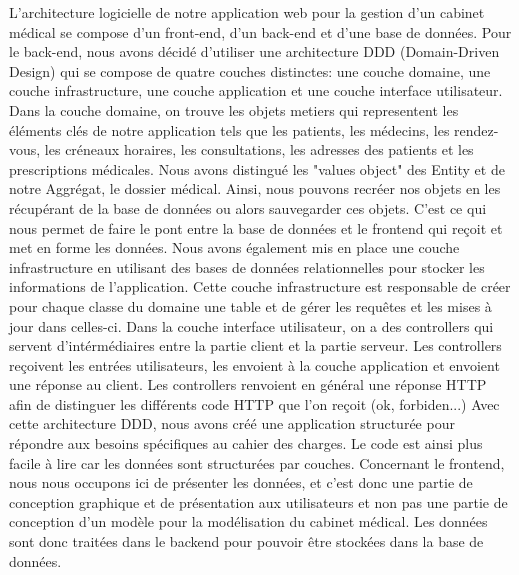 \documentclass[a4paper]{report}
\begin{document}
L'architecture logicielle de notre application web pour la gestion d'un cabinet médical se compose d'un front-end, d'un back-end et d'une base de données.
Pour le back-end, nous avons décidé d'utiliser une architecture DDD (Domain-Driven Design) qui se compose de quatre couches distinctes: une couche domaine, 
une couche infrastructure, une couche application et une couche interface utilisateur. \newline \newline
Dans la couche domaine, on trouve les objets metiers qui representent les éléments clés de notre application tels que les patients, les médecins, les rendez-vous, les créneaux horaires, les consultations, 
les adresses des patients et les prescriptions médicales. 
Nous avons distingué les "values object" des Entity et de notre Aggrégat, le dossier médical. Ainsi, nous pouvons recréer nos objets en les récupérant de la base de données ou
alors sauvegarder ces objets. C'est ce qui nous permet de faire le pont entre la base de données et le frontend qui reçoit et met en forme les données.\newline \newline
Nous avons également mis en place une couche infrastructure en utilisant des bases de 
données relationnelles pour stocker les informations de l'application. Cette couche infrastructure est responsable de créer 
pour chaque classe du domaine une table et de gérer les requêtes et les mises à jour dans celles-ci. \newline \newline
Dans la couche interface utilisateur, on a des controllers qui servent d'intérmédiaires entre la partie client et la partie serveur. 
Les controllers reçoivent les entrées utilisateurs, les envoient à la couche application et envoient une réponse au client. Les controllers renvoient en général
une réponse HTTP afin de distinguer les différents code HTTP que l'on reçoit (ok, forbiden...) \newline \newline
Avec cette architecture DDD, nous avons créé une application structurée pour répondre aux besoins spécifiques au cahier des charges. Le code est ainsi plus facile à lire
car les données sont structurées par couches.\newline\newline
Concernant le frontend, nous nous occupons ici de présenter les données, et c'est donc une partie de conception graphique et de présentation aux utilisateurs et non pas une partie
de conception d'un modèle pour la modélisation du cabinet médical. Les données sont donc traitées dans le backend pour pouvoir être stockées dans la base de données.
\end{document}
